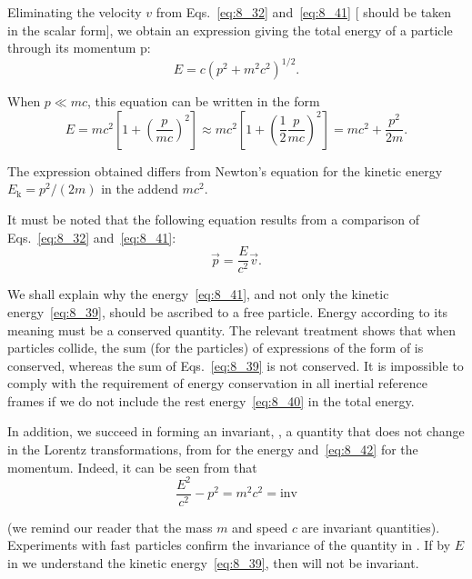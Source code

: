 Eliminating the velocity $v$ from Eqs.~\eqref{eq:8_32} and~\eqref{eq:8_41} [ should be taken in the scalar form], we obtain an expression giving the total energy of a particle through its momentum p:
\begin{equation}\label{eq:8_42}
	E = c\left(p^2 + m^2c^2\right)^{1/2}.
\end{equation}

\noindent
When $p\ll mc$, this equation can be written in the form
\begin{equation}\label{eq:8_43}
	E = mc^2\left[1 + \left(\frac{p}{mc}\right)^2\right]\approx mc^2\left[1 + \left(\frac{1}{2}\frac{p}{mc}\right)^2\right] = mc^2 + \frac{p^2}{2m}.
\end{equation}

\noindent
The expression obtained differs from Newton's equation for the kinetic energy $E_{\text{k}}=p^2/(2m)$ in the addend $mc^2$.

It must be noted that the following equation results from a comparison of Eqs.~\eqref{eq:8_32} and~\eqref{eq:8_41}:
\begin{equation}\label{eq:8_44}
	\vec{p} = \frac{E}{c^2}\vec{v}.
\end{equation}

We shall explain why the energy~\eqref{eq:8_41}, and not only the kinetic energy~\eqref{eq:8_39}, should be ascribed to a free particle. Energy according to its meaning must be a conserved quantity. The relevant treatment shows that when particles collide, the sum (for the particles) of expressions of the form of  is conserved, whereas the sum of Eqs.~\eqref{eq:8_39} is not conserved. It is impossible to comply with the requirement of energy conservation in all inertial reference frames if we do not include the rest energy~\eqref{eq:8_40} in the total energy.

In addition, we succeed in forming an invariant, \ie, a quantity that does not change in the Lorentz transformations, from  for the energy and~\eqref{eq:8_42} for the momentum. Indeed, it can be seen from  that
\begin{equation}\label{eq:8_45}
	\frac{E^2}{c^2} - p^2 = m^2c^2 = \text{inv}
\end{equation}

\noindent
(we remind our reader that the mass $m$ and speed $c$ are invariant quantities). Experiments with fast particles confirm the invariance of the quantity in . If by $E$ in  we understand the kinetic energy~\eqref{eq:8_39}, then  will not be invariant.

